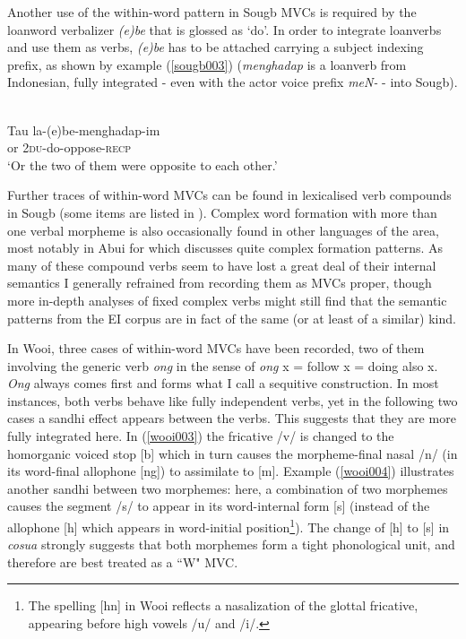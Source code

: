 Another use of the within-word pattern in Sougb MVCs is required by the loanword verbalizer \textit{(e)be} that is glossed as `do'. In order to integrate loanverbs and use them as verbs, \textit{(e)be} has to be attached carrying a subject indexing prefix, as shown by example (\ref{sougb003}) (\textit{menghadap} is a loanverb from Indonesian, fully integrated - even with the actor voice prefix \textit{meN-} - into Sougb).

\ea \label{sougb003}
\\
\gll Tau la-(e)be-menghadap-im \\
or 2\textsc{du}-do-oppose-\textsc{recp} \\
\glft `Or the two of them were opposite to each other.'\\
\z

Further traces of within-word MVCs can be found in lexicalised verb compounds in Sougb (some items are listed in \citealt[216]{reesink2002grammar}). Complex word formation with more than one verbal morpheme is also occasionally found in other languages of the area, most notably in Abui for which \citet{kratochvil2007grammar} discusses quite complex formation patterns. As many of these compound verbs seem to have lost a great deal of their internal semantics I generally refrained from recording them as MVCs proper, though more in-depth analyses of fixed complex verbs might still find that the semantic patterns from the EI corpus are in fact of the same (or at least of a similar) kind.

In Wooi, three cases of within-word MVCs have been recorded, two of them involving the generic verb \textit{ong} in the sense of \textit{ong} x = follow x = doing also x. \textit{Ong} always comes first and forms what I call a sequitive construction. In most instances, both verbs behave like fully independent verbs, yet in the following two cases a sandhi effect appears between the verbs. This suggests that they are more fully integrated here. In (\ref{wooi003}) the fricative /v/ is changed to the homorganic voiced stop [b] which in turn causes the morpheme-final nasal /n/ (in its word-final allophone [ng]) to assimilate to [m]. Example (\ref{wooi004}) illustrates another sandhi between two morphemes: here, a combination of two morphemes causes the segment /s/ to appear in its word-internal form [s] (instead of the allophone [h] which appears in word-initial position\footnote{The spelling [hn] in Wooi reflects a nasalization of the glottal fricative, appearing before high vowels /u/ and /i/.}). The change of [h] to [s] in \textit{cosua} strongly suggests that both morphemes form a tight phonological unit, and therefore are best treated as a ``W" MVC.

